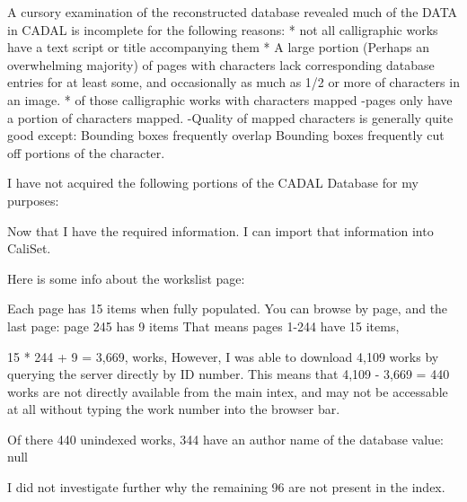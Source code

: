     A cursory examination of the reconstructed database revealed much of the DATA in CADAL is incomplete for the following reasons:
        * not all calligraphic works have a text script or title accompanying them
        * A large portion (Perhaps an overwhelming majority) of pages with characters lack corresponding database entries for at least some, and occasionally as much as 1/2 or more of characters in an image.
        * of those calligraphic works with characters mapped
            -pages only have a portion of characters mapped.
            -Quality of mapped characters is generally quite good except:
                Bounding boxes frequently overlap
                Bounding boxes frequently cut off portions of the character.                
    
    
    I have not acquired the following portions of the CADAL Database for my purposes:
    
    
    
    Now that I have the required information.  I can import that information into CaliSet.
    
    Here is some info about the workslist page:
    
    Each page has 15 items when fully populated.
    You can browse by page, and the last page:  page 245 has 9 items
    That means pages 1-244 have 15 items,
    
    15 * 244 + 9 = 3,669, works,
    However, I was able to download 4,109 works by querying the server directly by ID number.
    This means that 4,109 - 3,669 = 440 works are not directly available from the main intex, and may not be accessable at all without typing the work number into the browser bar.
    
    Of there 440 unindexed works, 344 have an author name of the database value: null
    
    I did not investigate further why the remaining 96 are not present in the index.
    
    
    
    
